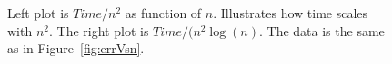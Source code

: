 \begin{figure}[h!]
\begin{subfigure}[b]{0.48\textwidth}
  \end{subfigure}
  \vspace{-0.1\baselineskip}
  \caption{Left plot is $Time/n^2$ as function of $n$. Illustrates how time scales with $n^2$. The right plot is $Time/(n^2 \log (n)$. The data is the same as in Figure~\ref{fig:errVsn}.}
  \label{fig:timeVsn}
\end{figure}
